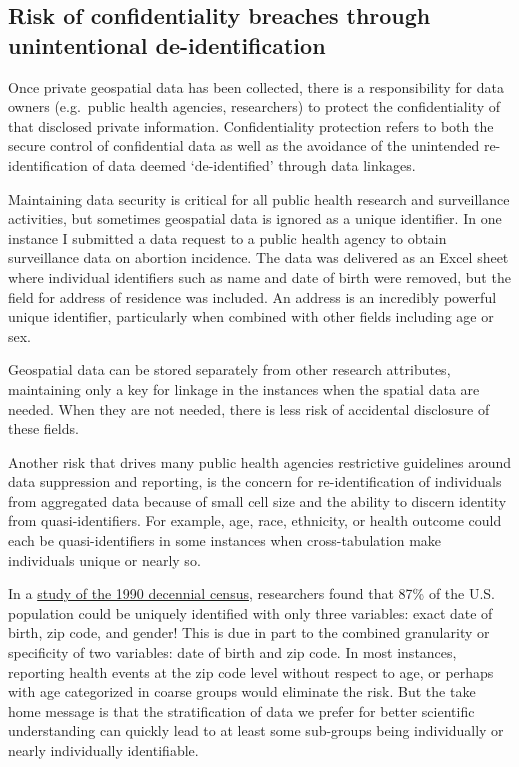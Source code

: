 \documentclass[
]{book}
\begin{document}
\hypertarget{risk-of-confidentiality-breaches-through-unintentional-de-identification}{%
\subsection{Risk of confidentiality breaches through unintentional de-identification}\label{risk-of-confidentiality-breaches-through-unintentional-de-identification}}

Once private geospatial data has been collected, there is a responsibility for data owners (e.g.~public health agencies, researchers) to protect the confidentiality of that disclosed private information. Confidentiality protection refers to both the secure control of confidential data as well as the avoidance of the unintended re-identification of data deemed `de-identified' through data linkages.

Maintaining data security is critical for all public health research and surveillance activities, but sometimes geospatial data is ignored as a unique identifier. In one instance I submitted a data request to a public health agency to obtain surveillance data on abortion incidence. The data was delivered as an Excel sheet where individual identifiers such as name and date of birth were removed, but the field for address of residence was included. An address is an incredibly powerful unique identifier, particularly when combined with other fields including age or sex.

Geospatial data can be stored separately from other research attributes, maintaining only a key for linkage in the instances when the spatial data are needed. When they are not needed, there is less risk of accidental disclosure of these fields.

Another risk that drives many public health agencies restrictive guidelines around data suppression and reporting, is the concern for re-identification of individuals from aggregated data because of small cell size and the ability to discern identity from quasi-identifiers. For example, age, race, ethnicity, or health outcome could each be quasi-identifiers in some instances when cross-tabulation make individuals unique or nearly so.

In a \href{https://dataprivacylab.org/projects/identifiability/paper1.pdf}{study of the 1990 decennial census}, researchers found that 87\% of the U.S. population could be uniquely identified with only three variables: exact date of birth, zip code, and gender! This is due in part to the combined granularity or specificity of two variables: date of birth and zip code. In most instances, reporting health events at the zip code level without respect to age, or perhaps with age categorized in coarse groups would eliminate the risk. But the take home message is that the stratification of data we prefer for better scientific understanding can quickly lead to at least some sub-groups being individually or nearly individually identifiable.
\end{document}
